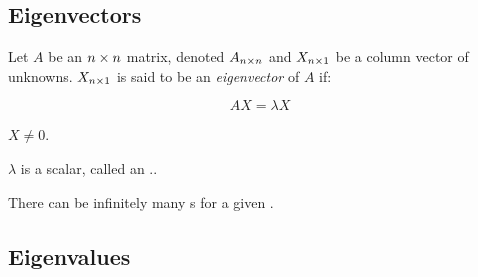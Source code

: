 \subsection{Eigenvectors}\label{subsec:Eigenvectors}
\begin{definition}[Eigenvector]\label{def:Eigenvector}
  Let $A$ be an $n \times n$ matrix, denoted $A_{n \times n}$ and $X_{n \times 1}$ be a column vector of unknowns.
  $X_{n \times 1}$ is said to be an \emph{eigenvector} of $A$ if:

  \begin{equation}\label{eq:Eigenvector}
    AX = \lambda X
  \end{equation}

  \begin{propertylist}
  \item $X \neq 0$.\label{prop:Eigenvector_Nonzero}
  \item $\lambda$ is a scalar, called an .\label{prop:Eigenvector_Value}.
  \end{propertylist}

  \begin{remark}
    There can be infinitely many s for a given .
  \end{remark}
\end{definition}


\subsection{Eigenvalues}\label{subsec:Eigenvalues}

